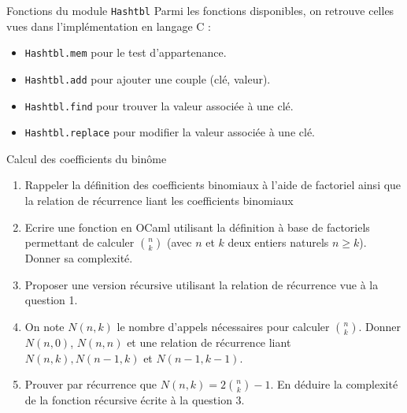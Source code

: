 \documentclass[10pt]{beamer}
\begin{document}
\begin{frame}{\Ctitle}{\stitle}
	\begin{block}{Fonctions du module {\tt Hashtbl}}
		Parmi les fonctions disponibles, on retrouve celles vues dans l'implémentation en langage C :
		\begin{itemize}
			\item<2-> \texttt{Hashtbl.mem} pour le test d'appartenance.
			\item<3-> \texttt{Hashtbl.add} pour ajouter une couple (clé, valeur).
			\item<4-> \texttt{Hashtbl.find} pour trouver la valeur associée à une clé.
			\item<5-> \texttt{Hashtbl.replace} pour modifier la valeur associée à une clé.
		\end{itemize}
	\end{block}
\end{frame}

\begin{frame}{\Ctitle}{\stitle}
	\begin{block}{Calcul des coefficients du binôme}
	\begin{enumerate}
		\item<1-> Rappeler la définition des coefficients binomiaux à l'aide de factoriel ainsi que la relation de récurrence liant les coefficients binomiaux
		\item<2-> Ecrire une fonction en OCaml utilisant la définition à base de factoriels permettant de calculer $\binom{n}{k}$ (avec $n$ et $k$ deux entiers naturels $n\geq k$). Donner sa complexité.
		\item<3-> Proposer une version récursive utilisant la relation de récurrence vue à la question 1.
		\item<4-> On note $N(n,k)$ le nombre d'appels  nécessaires pour calculer $\binom{n}{k}$. Donner $N(n,0)$, $N(n,n)$ et une relation de récurrence liant $N(n,k), N(n-1,k)$ et $N(n-1,k-1)$.
		\item<5-> Prouver par récurrence que $N(n,k) = 2\binom{n}{k} -1$. En déduire la complexité de la fonction récursive écrite à la question 3.
	\end{enumerate}
	\end{block}
\end{frame}
\end{document}
